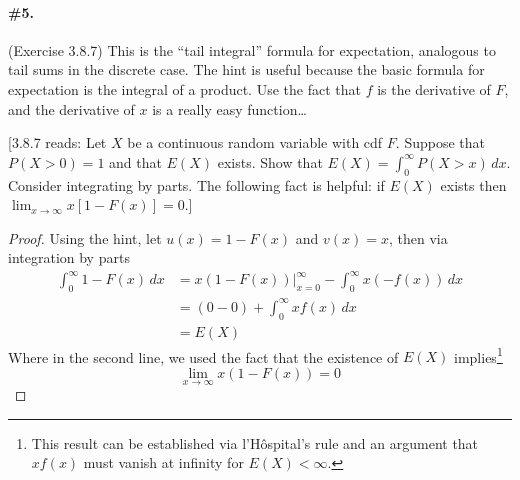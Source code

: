 \documentclass[12pt,titlepage]{article}
\begin{document}
\paragraph{\#5.} (Exercise 3.8.7) This is the ``tail integral'' formula for expectation, analogous to tail sums in the discrete case. The hint is useful because the basic formula for expectation is the integral of a product. Use the fact that $f$ is the derivative of $F$, and the derivative of $x$ is a really easy function\ldots

[3.8.7 reads:  Let $X$ be a continuous random variable with cdf $F$. Suppose that $P(X > 0) = 1$ and that $E(X)$ exists. Show that $E(X) = \int_{0}^{\infty}  P(X > x) \, dx$. \Hint Consider integrating by parts. The following fact is helpful: if $E(X)$ exists then $\lim_{x\to\infty} x [1 - F (x)] = 0$.] 

\begin{proof}
Using the hint, let $u(x) = 1-F(x)$ and $v(x) = x$, then via integration by parts
\begin{align*}
\int_{0}^{\infty} 1 - F(x) \, dx &= x(1-F(x))\bigr|_{x=0}^{\infty} - \int_{0}^{\infty}x(-f(x)) \, dx \\
&= (0 - 0) + \int_{0}^{\infty} x f(x) \, dx \\
&= E(X)
\end{align*}
Where in the second line, we used the fact that the existence of $E(X)$ implies\footnote{This result can be established via l'H\^{o}spital's rule and an argument that $xf(x)$ must vanish at infinity for $E(X) < \infty$.} \[\lim_{x\to\infty} x(1-F(x)) = 0\]
\end{proof}
\end{document}
